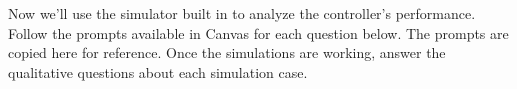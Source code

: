 
Now we'll use the simulator built in  to analyze the controller's performance. Follow the \GRno{} prompts
available in Canvas for each question below. The prompts are copied here for reference. Once the simulations are
working, answer the qualitative questions about each simulation case.

\vspace*{1cm}

